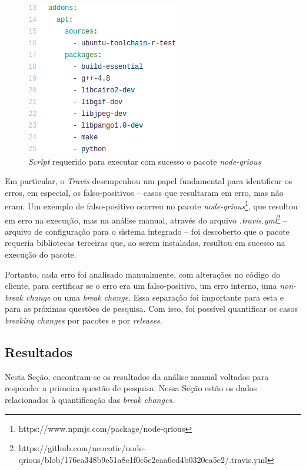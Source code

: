 \begin{itemize}
    \begin{figure}
        \centering
        \includegraphics[scale=0.6]{figuras/false_positive.png}
        \caption{\textit{Script} requerido para executar com sucesso o pacote \textit{node-qrious}}
        \label{fig:false-positive}
    \end{figure}{}

    Em particular, o \textit{Travis} desempenhou um papel fundamental para identificar os erros, em especial, os falso-positivos -- casos que resultaram em erro, mas não eram. Um exemplo de falso-positivo ocorreu no pacote \textit{node-qrious}\footnote{https://www.npmjs.com/package/node-qrious}, que resultou em erro na execução, mas na análise manual, através do arquivo \textit{.travis.yml}\footnote{https://github.com/neocotic/node-qrious/blob/176ea348b9e51a8c1f0c5e2caa6cd4b0320ea5e2/.travis.yml} -- arquivo de configuração para o sistema integrado -- foi descoberto que o pacote requeria bibliotecas terceiras que, ao serem instaladas, resultou em sucesso na execução do pacote.
\end{itemize}{}

Portanto, cada erro foi analisado manualmente, com alterações no código do cliente, para certificar se o erro era um falso-positivo, um erro interno, uma \textit{non-break change} ou uma \textit{break change}. Essa separação foi importante para esta e para as próximas questões de pesquisa. Com isso, foi possível quantificar os casos \textit{breaking changes} por pacotes e por \textit{releases}.

\subsection{Resultados}
\label{fin:rq1}
Nesta Seção, encontram-se os resultados da análise manual voltados para responder a primeira questão de pesquisa. Nessa Seção estão os dados relacionados à quantificação das \textit{break changes}.

